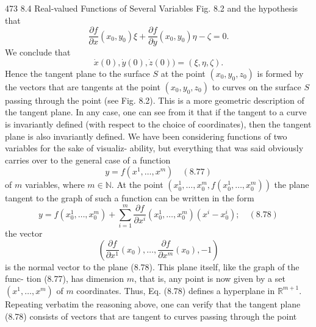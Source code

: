 473
8.4 Real-valued Functions of Several Variables
Fig. 8.2
and the hypothesis that
$$\frac{\partial f}{\partial x}(x_0, y_0)\xi + \frac{\partial f}{\partial y}(x_0, y_0)\eta - \zeta = 0.$$
We conclude that
$$\dot{x}(0), \dot{y}(0), \dot{z}(0)) = (\xi, \eta, \zeta).$$
Hence the tangent plane to the surface $S$ at the point $(x_0, y_0, z_0)$ is formed by the
vectors that are tangents at the point $(x_0, y_0, z_0)$ to curves on the surface $S$ passing
through the point (see Fig. 8.2).
This is a more geometric description of the tangent plane. In any case, one can
see from it that if the tangent to a curve is invariantly defined (with respect to the
choice of coordinates), then the tangent plane is also invariantly defined.
We have been considering functions of two variables for the sake of visualiz-
ability, but everything that was said obviously carries over to the general case of a
function
$$y = f(x^1,\ldots,x^m) \quad (8.77)$$
of $m$ variables, where $m \in \mathbb{N}.$
At the point $(x_0^1, \ldots, x_0^m, f (x_0^1, \ldots, x_0^m))$ the plane tangent to the graph of such
a function can be written in the form
$$y = f(x_0^1,\ldots,x_0^m) + \sum_{i=1}^m \frac{\partial f}{\partial x^i}(x_0^1,\ldots,x_0^m)(x^i - x_0^i); \quad (8.78)$$
the vector
$$\left( \frac{\partial f}{\partial x^1}(x_0), \ldots, \frac{\partial f}{\partial x^m}(x_0), -1 \right)$$
is the normal vector to the plane (8.78). This plane itself, like the graph of the func-
tion (8.77), has dimension $m$, that is, any point is now given by a set $(x^1, \ldots, x^m)$
of $m$ coordinates.
Thus, Eq. (8.78) defines a hyperplane in $\mathbb{R}^{m+1}.$
Repeating verbatim the reasoning above, one can verify that the tangent plane
(8.78) consists of vectors that are tangent to curves passing through the point